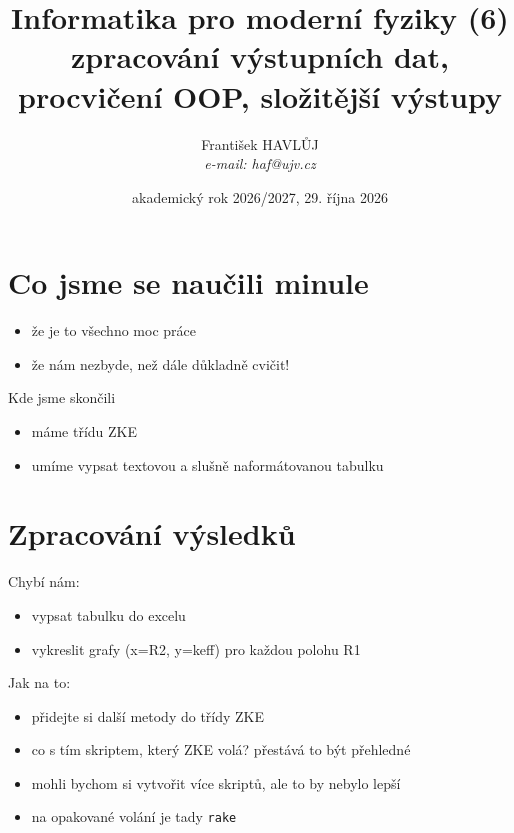 \documentclass{beamer}
\title[IMF (6)]{Informatika pro moderní fyziky (6)\\zpracování výstupních dat, procvičení OOP, složitější výstupy}
\author[Franti\v{s}ek HAVL\r{U}J, ORF ÚJV Řež]{Franti\v{s}ek HAVL\r{U}J\\{\scriptsize \emph{e-mail: haf@ujv.cz}}}
\date{akademický rok 2026/2027, 29. října 2026}
\institute[ORF ÚJV Řež]
{ÚJV Řež\\oddělení Reaktorové fyziky a podpory palivového cyklu}
\begin{document}
\begin{frame}
  \titlepage
\end{frame}

\begin{frame}
  \tableofcontents
\end{frame}

\section{Co jsme se naučili minule}

\begin{frame}{}
  \begin{itemize}
    \item že je to všechno moc práce
    \item že nám nezbyde, než dále důkladně cvičit! 
  \end{itemize}
\end{frame}

\begin{frame}{Kde jsme skončili}
  \begin{itemize}
    \item máme třídu ZKE
    \item umíme vypsat textovou a slušně naformátovanou tabulku 
  \end{itemize}
\end{frame}

\section{Zpracování výsledků}

\begin{frame}
  Chybí nám:
  \begin{itemize}
    \item vypsat tabulku do excelu
    \item vykreslit grafy (x=R2, y=keff) pro každou polohu R1   
  \end{itemize}
\end{frame}

\begin{frame}[fragile]
  Jak na to:
  \begin{itemize}
    \item přidejte si další metody do třídy ZKE
    \item co s tím skriptem, který ZKE volá? přestává to být přehledné
    \item mohli bychom si vytvořit více skriptů, ale to by nebylo lepší 
    \item na opakované volání je tady \texttt{rake}
  \end{itemize}
\end{frame}
\end{document}
